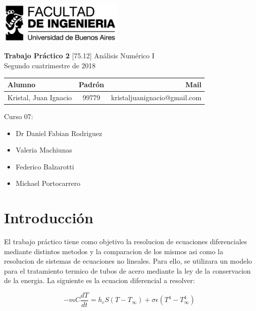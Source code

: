\documentclass[11pt,a4paper]{article}
\begin{document}
\begin{titlepage}
	\hfill\includegraphics[width=6cm]{figuras/fiuba.jpg}
    \begin{center}
    \vfill
    \Huge \textbf{Trabajo Práctico 2}
    \vskip2cm
    \Large [75.12] Análisis Numérico I\\
    Segundo cuatrimestre de 2018
    \vfill
    \begin{tabular}{|l|c|r|}
	\hline
	Alumno & Padrón & Mail\\
	\hline
	\hline
	Kristal, Juan Ignacio & 99779 & kristaljuanignacio@gmail.com\\
	\hline
	\end{tabular}
    \vskip2cm
    \end{center}

    Curso 07:

    \begin{itemize}
    \item Dr Daniel Fabian Rodriguez
    \item Valeria Machiunas
    \item Federico Balzarotti
    \item Michael Portocarrero
    \end{itemize}

\end{titlepage}



\tableofcontents
\thispagestyle{onlyheader}
\newpage

\setcounter{page}{1}

\section{Introducción}
El trabajo práctico tiene como objetivo la resolucion de ecuaciones diferenciales mediante distintos metodos y la comparacion de los mismos asi como la resolucion de sistemas de ecuaciones no lineales. Para ello, se utilizara un modelo para el tratamiento termico de tubos de acero mediante la ley de la conservacion de la energia. La siguiente es la ecuacion diferencial a resolver:

\begin{equation}
-mC \frac{dT}{dt} = h_c S (T - T_\infty) + \sigma \epsilon (T^4 - T^4_\infty)
\end{equation}
\end{document}
